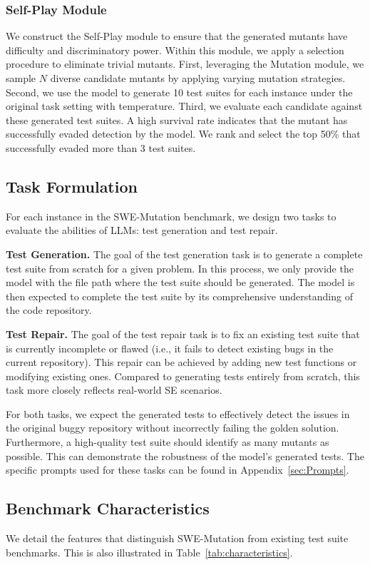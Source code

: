 \documentclass[11pt]{article}
\begin{document}
\subsubsection{Self-Play Module}
We construct the Self-Play module to ensure that the generated mutants have difficulty and discriminatory power. Within this module, we apply a selection procedure to eliminate trivial mutants. First, leveraging the Mutation module, we sample $N$ diverse candidate mutants by applying varying mutation strategies. Second, we use the model to generate 10 test suites for each instance under the original task setting with temperature. Third, we evaluate each candidate against these generated test suites. A high survival rate indicates that the mutant has successfully evaded detection by the model. We rank and select the top 50\% that successfully evaded more than 3 test suites.

\subsection{Task Formulation}
For each instance in the SWE-Mutation benchmark, we design two tasks to evaluate the abilities of LLMs: test generation and test repair.

\textbf{Test Generation.} The goal of the test generation task is to generate a complete test suite from scratch for a given problem. In this process, we only provide the model with the file path where the test suite should be generated. The model is then expected to complete the test suite by its comprehensive understanding of the code repository.

\textbf{Test Repair.} The goal of the test repair task is to fix an existing test suite that is currently incomplete or flawed (i.e., it fails to detect existing bugs in the current repository). This repair can be achieved by adding new test functions or modifying existing ones. Compared to generating tests entirely from scratch, this task more closely reflects real-world SE scenarios.  

For both tasks, we expect the generated tests to effectively detect the issues in the original buggy repository without incorrectly failing the golden solution. Furthermore, a high-quality test suite should identify as many mutants as possible. This can demonstrate the robustness of the model's generated tests. The specific prompts used for these tasks can be found in Appendix~\ref{sec:Prompts}.

\subsection{Benchmark Characteristics}
We detail the features that distinguish SWE-Mutation from existing test suite benchmarks. This is also illustrated in Table~\ref{tab:characteristics}.
\end{document}
